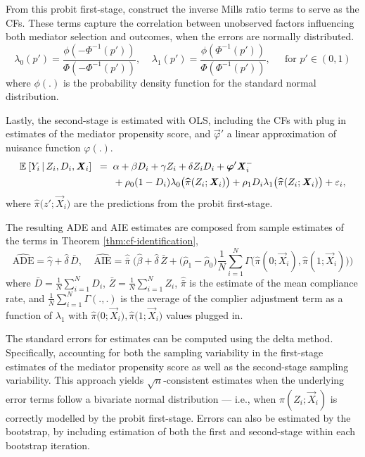 From this probit first-stage, construct the inverse Mills ratio terms to serve as the CFs.
These terms capture the correlation between unobserved factors influencing both mediator selection and outcomes, when the errors are normally distributed.
\[ \lambda_0(p') =
        \frac{\phi( - \Phi^{-1}(p') )}{\Phi( -\Phi^{-1}(p') )}, \;\;\;\;
    \lambda_1(p') =
        \frac{\phi( \Phi^{-1}(p') )}{\Phi( \Phi^{-1}(p') )},
        \;\;\;\; \text{ for } p' \in (0,1) \]
where $\phi(.)$ is the probability density function for the standard normal distribution.

Lastly, the second-stage is estimated with OLS, including the CFs with plug in estimates of the mediator propensity score, and $\vec \varphi'$ a linear approximation of nuisance function $\varphi(.)$.
\begin{align*}
    \mathbb{E}_{} \left[ Y_i \, \middle\vert \, Z_i, D_i, \boldsymbol{\mathit{X}}_i \right] \;\; =& \;\;
        \alpha
        + \beta D_i
        + \gamma Z_i
        + \delta Z_i D_i
        + \boldsymbol{\mathit{\varphi}}' \boldsymbol{\mathit{X}}_i^- \\
        & \;\; + \rho_0 (1 - D_i) \lambda_0 \big( \widehat{\pi}(Z_i; \boldsymbol{\mathit{X}}_i) \big)
    + \rho_1 D_i \lambda_1\big( \widehat{\pi}(Z_i; \boldsymbol{\mathit{X}}_i) \big)
    + \varepsilon_i,
\end{align*}
where $\hat\pi \big(z';\vec X_i \big)$ are the predictions from the probit first-stage.

The resulting ADE and AIE estimates are composed from sample estimates of the terms in Theorem \ref{thm:cf-identification},
\[ \hat{\text{ADE}}
    = \hat{\gamma} + \hat{\delta}\,\bar D, \;\;\;\;
    \hat{\text{AIE}}
    = \hat{\bar\pi}\; \Big(
        \hat{\beta} + \hat{\delta}\,\bar Z
        + \big(\hat \rho_1 - \hat \rho_0 \big)
        \frac1N \sum_{i=1}^N \Gamma \big( \hat\pi(0;\vec X_i), \hat\pi(1;\vec X_i)\big) \Big) \]
where $\bar D = \frac1N \sum_{i=1}^N D_i$, $\bar Z = \frac1N \sum_{i=1}^N Z_i$,
$\hat{\bar\pi}$ is the estimate of the mean compliance rate, and $\frac1N \sum_{i=1}^N \Gamma(.,.)$ is the average of the complier adjustment term as a function of $\lambda_1$ with $\hat\pi \big(0; \vec X_i \big), \hat\pi \big(1; \vec X_i \big)$ values plugged in.

The standard errors for estimates can be computed using the delta method.
Specifically, accounting for both the sampling variability in the first-stage estimates of the mediator propensity score as well as the second-stage sampling variability.
This approach yields $\sqrt{n}$-consistent estimates when the underlying error terms follow a bivariate normal distribution --- i.e., when $\pi(Z_i; \vec X_i)$ is correctly modelled by the probit first-stage.
Errors can also be estimated by the bootstrap, by including estimation of both the first and second-stage within each bootstrap iteration.

